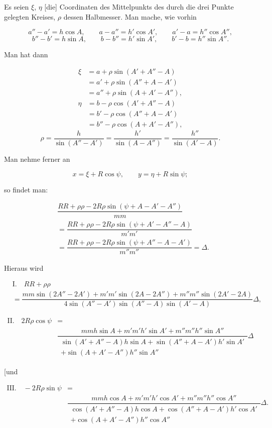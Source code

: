 

Es seien $\xi$, $\eta$ [die] Coordinaten des Mittelpunkts des durch die drei Punkte gelegten Kreises, $\rho$ dessen Halbmesser. Man mache, wie vorhin

\[
a'' - a' = h\cos A, \qquad a - a'' = h'\cos A', \qquad a' - a = h''\cos A'',
\]
\[
b'' - b' = h\sin A, \qquad b - b'' = h'\sin A', \qquad b' - b = h''\sin A''.
\]

Man hat dann

\[
\begin{aligned}
\xi &= a + \rho\sin(A'+A''-A)\\ &= a' + \rho\sin(A''+A-A')\\ &= a'' + \rho\sin(A+A'-A''),
\end{aligned}
\]
\[
\begin{aligned}
\eta &= b - \rho\cos(A'+A''-A)\\ &= b' - \rho\cos(A''+A-A')\\ &= b'' - \rho\cos(A+A'-A''),
\end{aligned}
\]
\[
\rho = \dfrac{h}{\sin(A''-A')} = \dfrac{h'}{\sin(A-A'')} = \dfrac{h''}{\sin(A'-A)}.
\]

\begin{center}\end{center}

Man nehme ferner an

\[
x = \xi + R\cos\psi, \qquad y = \eta + R\sin\psi;
\]

so findet man:

\[
\begin{aligned}
&\dfrac{RR+\rho\rho-2R\rho\sin(\psi+A-A'-A'')}{mm}\\ &= \dfrac{RR+\rho\rho-2R\rho\sin(\psi+A'-A''-A)}{m'm'}\\ &= \dfrac{RR+\rho\rho-2R\rho\sin(\psi+A''-A-A')}{m''m''} = \Delta.
\end{aligned}
\]

Hieraus wird

\[
\begin{aligned}&\mathrm{I.}\quad RR+\rho\rho\\ &=\dfrac{mm\sin(2A''-2A')+m'm'\sin(2A-2A'')+m''m''\sin(2A'-2A)}{4\sin(A''-A')\sin(A''-A)\sin(A'-A)}\Delta,\end{aligned}
\]

\[
\begin{aligned}\mathrm{II.}\quad 2R\rho\cos\psi&=\\ &\dfrac{mmh\sin A+m'm'h'\sin A'+m''m''h''\sin A''}{\substack{\sin(A'+A''-A)h\sin A+\sin(A''+A-A')h'\sin A'\\+\sin(A+A'-A'')h''\sin A''}}\Delta\end{aligned}
\]

[und

\[
\begin{aligned}\mathrm{III.}\quad -2R\rho\sin\psi&=\\ &\dfrac{mmh\cos A+m'm'h'\cos A'+m''m''h''\cos A''}{\substack{\cos(A'+A''-A)h\cos A+\cos(A''+A-A')h'\cos A'\\+\cos(A+A'-A'')h''\cos A''}}\Delta.\end{aligned}
\]
